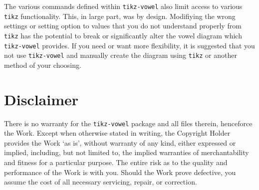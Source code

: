 \documentclass{article}
\newcommand{\pkg}[1]{\texttt{#1}}
\begin{document}
The various commands defined within \pkg{tikz-vowel} also limit access to various \pkg{tikz} functionality.  This, in large part, was by design.  Modifiying the wrong settings or setting option to values that you do not understand properly from \pkg{tikz} has the potential to break or significantly alter the vowel diagram which \pkg{tikz-vowel} provides.  If you need or want more flexibility, it is suggested that you not use \pkg{tikz-vowel} and manually create the diagram using \pkg{tikz} or another method of your choosing.






\section{Disclaimer}
\label{sec:Disclaimer}

There is no warranty for the \pkg{tikz-vowel} package and all files therein, henceforce the Work. Except when otherwise stated in writing, the Copyright Holder provides the Work `as is’, without warranty of any kind, either expressed or implied, including, but not limited to, the implied warranties of merchantability and fitness for a particular purpose. The entire risk as to the quality and performance of the Work is with you. Should the Work prove defective, you assume the cost of all necessary servicing, repair, or correction.
\end{document}
